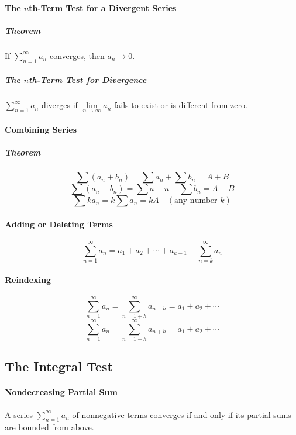 \documentclass{article}
\begin{document}
            \paragraph{The $n$th-Term Test for a Divergent Series}
                \subparagraph{Theorem} If $\sum_{n=1}^\infty a_n$ converges, then $a_n\to 0$.
                \subparagraph{The $n$th-Term Test for Divergence}
                $\sum_{n=1}^\infty a_n$ diverges if $\lim\limits_{n\to\infty}a_n$ fails to exist or is different from zero.
            \paragraph{Combining Series}
                \subparagraph{Theorem}
                \[\sum (a_n+b_n)=\sum a_n+\sum b_n=A+B\]
                \[\sum (a_n-b_n)=\sum a-n-\sum b_n=A-B\]
                \[\sum ka_n=k\sum a_n=kA\quad (\text{any number } k)\]
            \paragraph{Adding or Deleting Terms}
                \[\sum_{n=1}^\infty a_n=a_1+a_2+\cdots+a_{k-1}+\sum_{n=k}^\infty a_n\]
            \paragraph{Reindexing}
                \[\sum_{n=1}^\infty a_n=\sum_{n=1+h}^\infty a_{n-h}=a_1+a_2+\cdots\]
                \[\sum_{n=1}^\infty a_n=\sum_{n=1-h}^\infty a_{n+h}=a_1+a_2+\cdots\]
        \subsection{The Integral Test}
            \paragraph{Nondecreasing Partial Sum} A series $\sum_{n=1}^\infty a_n$ of nonnegative terms converges if and only if its partial sums are bounded from above.
\end{document}
